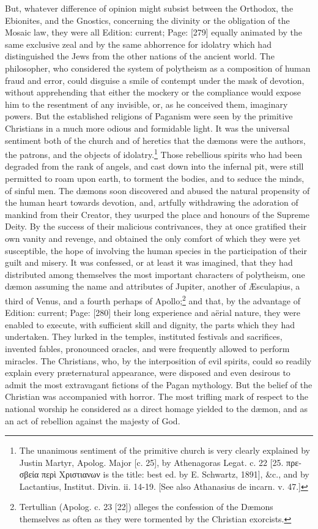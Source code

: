 But, whatever difference of opinion might subsist between the Orthodox, the Ebionites, and the Gnostics, concerning the divinity or the obligation of the Mosaic law, they were all Edition: current; Page: [279] equally animated by the same exclusive zeal and by the same abhorrence for idolatry which had distinguished the Jews from the other nations of the ancient world. The philosopher, who considered the system of polytheism as a composition of human fraud and error, could disguise a smile of contempt under the mask of devotion, without apprehending that either the mockery or the compliance would expose him to the resentment of any invisible, or, as he conceived them, imaginary powers. But the established religions of Paganism were seen by the primitive Christians in a much more odious and formidable light. It was the universal sentiment both of the church and of heretics that the dæmons were the authors, the patrons, and the objects of idolatry.\footnote{The unanimous sentiment of the primitive church is very clearly explained by Justin Martyr, Apolog. Major [c. 25], by Athenagoras Legat. c. 22 [25. \textgreek{πρεσβεία περ\texthebrew{ὶ} Χριστιανων} is the title: best ed. by E. Schwartz, 1891], \&c., and by Lactantius, Institut. Divin. ii. 14-19. [See also Athanasius de incarn. v. 47.]} Those rebellious spirits who had been degraded from the rank of angels, and cast down into the infernal pit, were still permitted to roam upon earth, to torment the bodies, and to seduce the minds, of sinful men. The dæmons soon discovered and abused the natural propensity of the human heart towards devotion, and, artfully withdrawing the adoration of mankind from their Creator, they usurped the place and honours of the Supreme Deity. By the success of their malicious contrivances, they at once gratified their own vanity and revenge, and obtained the only comfort of which they were yet susceptible, the hope of involving the human species in the participation of their guilt and misery. It was confessed, or at least it was imagined, that they had distributed among themselves the most important characters of polytheism, one dæmon assuming the name and attributes of Jupiter, another of Æsculapius, a third of Venus, and a fourth perhaps of Apollo;\footnote{Tertullian (Apolog. c. 23 [22]) alleges the confession of the Dæmons themselves as often as they were tormented by the Christian exorcists.} and that, by the advantage of Edition: current; Page: [280] their long experience and aërial nature, they were enabled to execute, with sufficient skill and dignity, the parts which they had undertaken. They lurked in the temples, instituted festivals and sacrifices, invented fables, pronounced oracles, and were frequently allowed to perform miracles. The Christians, who, by the interposition of evil spirits, could so readily explain every præternatural appearance, were disposed and even desirous to admit the most extravagant fictions of the Pagan mythology. But the belief of the Christian was accompanied with horror. The most trifling mark of respect to the national worship he considered as a direct homage yielded to the dæmon, and as an act of rebellion against the majesty of God.

